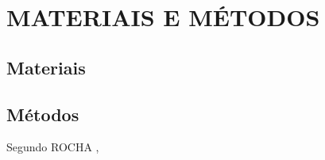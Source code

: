 \chapter{MATERIAIS E MÉTODOS}
\label{Material_metodo}

\section{Materiais}
\hspace{0.5cm} \lipsum[13-15]

\section{Métodos}

\hspace{0.5cm} \lipsum[13-15] \cite{Rocha2009a,Costa2007}

Segundo ROCHA \citeyear{Rocha2009a},\lipsum[13-15]

